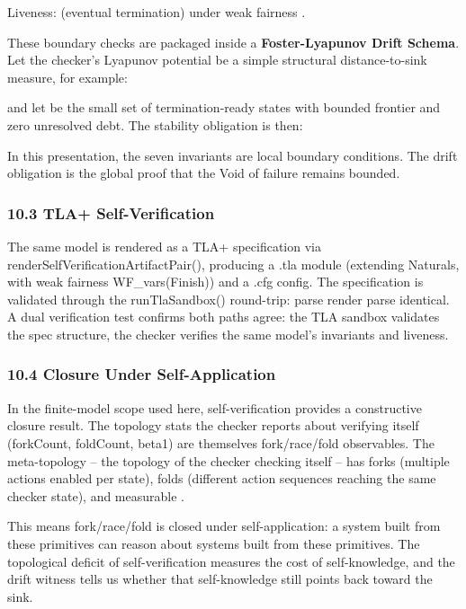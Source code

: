 \documentclass[
]{article}
\begin{document}
Liveness: (eventual termination) under weak fairness .

These boundary checks are packaged inside a \textbf{Foster-Lyapunov
Drift Schema}. Let the checker's Lyapunov potential be a simple
structural distance-to-sink measure, for example:

and let be the small set of termination-ready states with bounded
frontier and zero unresolved debt. The stability obligation is then:

In this presentation, the seven invariants are local boundary
conditions. The drift obligation is the global proof that the Void of
failure remains bounded.

\subsubsection{\texorpdfstring{\textbf{10.3 TLA+
Self-Verification}}{10.3 TLA+ Self-Verification}}\label{tla-self-verification}

The same model is rendered as a TLA+ specification via
renderSelfVerificationArtifactPair(), producing a .tla module (extending
Naturals, with weak fairness WF\_vars(Finish)) and a .cfg config. The
specification is validated through the runTlaSandbox() round-trip: parse
render parse identical. A dual verification test confirms both paths
agree: the TLA sandbox validates the spec structure, the checker
verifies the same model's invariants and liveness.

\subsubsection{\texorpdfstring{\textbf{10.4 Closure Under
Self-Application}}{10.4 Closure Under Self-Application}}\label{closure-under-self-application}

In the finite-model scope used here, self-verification provides a
constructive closure result. The topology stats the checker reports
about verifying itself (forkCount, foldCount, beta1) are themselves
fork/race/fold observables. The meta-topology -- the topology of the
checker checking itself -- has forks (multiple actions enabled per
state), folds (different action sequences reaching the same checker
state), and measurable .

This means fork/race/fold is closed under self-application: a system
built from these primitives can reason about systems built from these
primitives. The topological deficit of self-verification measures the
cost of self-knowledge, and the drift witness tells us whether that
self-knowledge still points back toward the sink.
\end{document}
